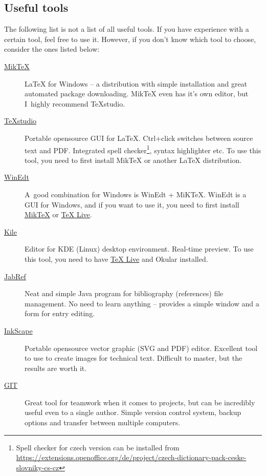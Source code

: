 \subsection*{Useful tools} 
\label{nastroje}

The following list is not a list of all useful tools. If you have experience with a certain tool, feel free to use it. However, if you don't know which tool to choose, consider the ones listed below:

\begin{description}
	\item[\href{http://miktex.org/download}{MikTeX}] \LaTeX{} for Windows -- a distribution with simple installation and great automated package downloading. MikTeX even has it's own editor, but I~highly recommend TeXstudio.
	\item[\href{http://texstudio.sourceforge.net/}{TeXstudio}] Portable opensource GUI for \LaTeX{}. Ctrl+click switches between source text and PDF. Integrated spell checker\footnote{Spell checker for czech version can be installed from \url{https://extensions.openoffice.org/de/project/czech-dictionary-pack-ceske-slovniky-cs-cz}}, syntax highlighter etc. To use this tool, you need to first install MikTeX or another \LaTeX{} distribution.
    \item[\href{http://www.winedt.com/}{WinEdt}] A~good combination for Windows is WinEdt + MiKTeX. WinEdt is a GUI for Windows, and if you want to use it, you need to first install \href{http://miktex.org/download}{MikTeX} or \href{http://www.tug.org/texlive/}{TeX Live}.
    \item[\href{http://kile.sourceforge.net/}{Kile}] Editor for KDE (Linux) desktop environment. Real-time preview. To use this tool, you need to have \href{http://www.tug.org/texlive/}{TeX Live} and Okular installed.
	\item[\href{http://jabref.sourceforge.net/download.php}{JabRef}] Neat and simple Java program for bibliography (references) file management. No need to learn anything -- provides a simple window and a form for entry editing.
	\item[\href{https://inkscape.org/en/download/}{InkScape}] Portable opensource vector graphic (SVG and PDF) editor. Excellent tool to use to create images for technical text. Difficult to master, but the results are worth it.
	\item[\href{https://git-scm.com/}{GIT}] Great tool for teamwork when it comes to projects, but can be incredibly useful even to a single author. Simple version control system, backup options and transfer between multiple computers.

\end{description}
